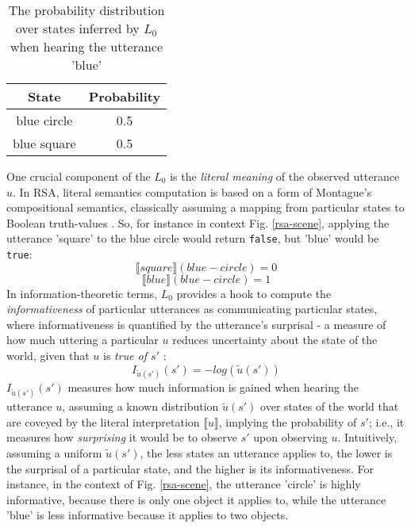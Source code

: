 \begin{table}[h]
\begin{center}
	\caption{The probability distribution over states inferred by $L_0$ when hearing the utterance 'blue'}
	\label{rsa-l0}
	\vskip 0.12in
	\begin{tabular}{cc}
		State & Probability \\
		\hline
		blue circle & 0.5 \\
		blue square & 0.5
	\end{tabular}
\end{center}
\end{table}
One crucial component of the $L_0$ is the \emph{literal meaning} of the observed utterance $u$. In RSA, literal semantics computation is based on a form of Montague’s compositional semantics, classically assuming a mapping from particular states to Boolean truth-values \parencite{montague1973proper} \parencite[but see e.g.][for alternative approaches]{degen2020redundancy}. 
So, for instance in context Fig. \ref{rsa-scene}, applying the utterance 'square' to the blue circle would return \texttt{false}, but 'blue' would be \texttt{true}:
$$\llbracket square \rrbracket (blue-circle) = 0$$
$$\llbracket blue \rrbracket (blue-circle) = 1$$
In information-theoretic terms, $L_0$ provides a hook to compute the \emph{informativeness} of particular utterances as communicating particular states, 
where informativeness is quantified by the utterance's surprisal - a measure of how much uttering a particular $u$ reduces uncertainty about the state of the world, given that $u$ is \emph{true of $s'$} \parencite{frank2012predicting}: 
$$I_{ \tilde{u} (s')}(s') = -log(\tilde{u} (s'))$$
$I_{\tilde{u} (s')}(s')$ measures how much information is gained when hearing the utterance $u$, assuming a known distribution $\tilde{u} (s')$ over states of the world that are coveyed by the literal interpretation $\llbracket u \rrbracket$, implying the probability of $s'$; i.e., it measures how \emph{surprising} it would be to observe $s'$ upon observing $u$.
Intuitively, assuming a uniform $\tilde{u} (s')$, the less states an utterance applies to, the lower is the surprisal of a particular state, and the higher is its informativeness. For instance, in the context of Fig. \ref{rsa-scene}, the utterance 'circle' is highly informative, because there is only one object it applies to, while the utterance 'blue' is less informative because it applies to two objects. 

